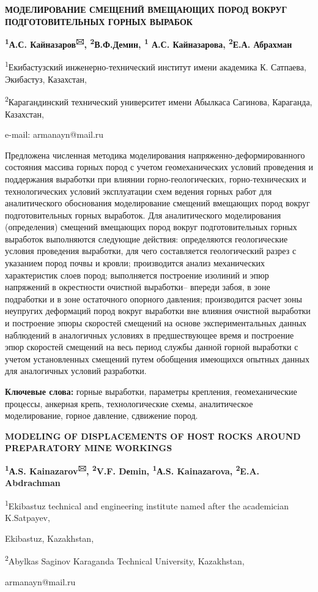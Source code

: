\begin{center}
{\large\bfseries МОДЕЛИРОВАНИЕ СМЕЩЕНИЙ ВМЕЩАЮЩИХ ПОРОД ВОКРУГ ПОДГОТОВИТЕЛЬНЫХ
ГОРНЫХ ВЫРАБОК}

{\bfseries \textsuperscript{1}А.С. Кайназаров\textsuperscript{🖂},
\textsuperscript{2}В.Ф.Демин, \textsuperscript{1} А.С. Кайназарова,
\textsuperscript{2}Е.А. Абрахман}

\textsuperscript{1}Екибастузский инженерно-технический институт имени
академика К. Сатпаева, Экибастуз, Казахстан,

\textsuperscript{2}Карагандинский технический университет имени Абылкаса
Сагинова, Караганда, Казахстан,

e-mail: armanayn@mail.ru
\end{center}

Предложена численная методика моделирования напряженно-деформированного
состояния массива горных пород с учетом геомеханических условий
проведения и поддержания выработки при влиянии горно-геологических,
горно-технических и технологических условий эксплуатации схем ведения
горных работ для аналитического обоснования моделирование смещений
вмещающих пород вокруг подготовительных горных выработок. Для
аналитического моделирования (определения) смещений вмещающих пород
вокруг подготовительных горных выработок выполняются следующие действия:
определяются геологические условия проведения выработки, для чего
составляется геологический разрез с указанием пород почвы и кровли;
производится анализ механических характеристик слоев пород; выполняется
построение изолиний и эпюр напряжений в окрестности очистной выработки--
впереди забоя, в зоне подработки и в зоне остаточного опорного давления;
производится расчет зоны неупругих деформаций пород вокруг выработки вне
влияния очистной выработки и построение эпюры скоростей смещений на
основе экспериментальных данных наблюдений в аналогичных условиях в
предшествующее время и построение эпюр скоростей смещений на весь период
службы данной горной выработки с учетом установленных смещений путем
обобщения имеющихся опытных данных для аналогичных условий разработки.

{\bfseries Ключевые слова:} горные выработки, параметры крепления,
геомеханические процессы, анкерная крепь, технологические схемы,
аналитическое моделирование, горное давление, сдвижение пород.

\begin{center}
{\large\bfseries MODELING OF DISPLACEMENTS OF HOST ROCKS AROUND PREPARATORY MINE WORKINGS}

{\bfseries \textsuperscript{1}А.S. Kainazarov\textsuperscript{🖂},
\textsuperscript{2}V.F. Dеmin, \textsuperscript{1}А.S. Kainazarova,
\textsuperscript{2}E.A. Abdrachman}

\textsuperscript{1}Ekibastuz technical and engineering institute named
after the academician K.Satpayev,

Ekibastuz, Kazakhstan,

\textsuperscript{2}Abylkas Saginov Karaganda Technical University,
Kazakhstan,

armanayn@mail.ru
\end{center}

